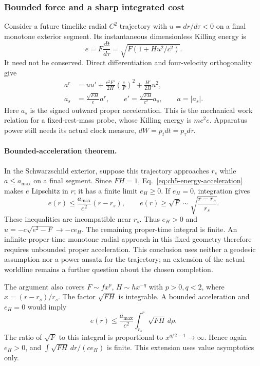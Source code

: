 \documentclass[10pt,twocolumn,letterpaper]{article}
\begin{document}
\subsubsection{Bounded force and a sharp integrated cost}
Consider a future timelike radial $C^2$ trajectory with
$u=dr/d\tau<0$ on a final monotone exterior segment. Its instantaneous
dimensionless Killing energy is
\[
 e=F\frac{dt}{d\tau}=\sqrt{F(1+Hu^2/c^2)}.
\]
It need not be conserved. Direct differentiation and four-velocity
orthogonality give
\begin{align}
 a^r&=uu'+\frac{c^2F'}{2H}\left(\frac eF\right)^2
               +\frac{H'}{2H}u^2,\nonumber\\
 a_s&=\frac{\sqrt{FH}}e a^r,\qquad
 e'=\frac{\sqrt{FH}}{c^2}a_s,\qquad a=|a_s|.
 \label{eq:ch5-energy-acceleration}
\end{align}
Here $a_s$ is the signed outward proper acceleration. This is the
mechanical work relation for a fixed-rest-mass probe, whose Killing
energy is $mc^2e$. Apparatus power still needs its actual clock measure,
$dW=p_tdt=p_\tau d\tau$.

\paragraph{Bounded-acceleration theorem.}
In the Schwarzschild exterior, suppose this trajectory approaches
$r_s$ while $a\leq a_{\max}$ on a final segment. Since $FH=1$,
Eq.~\eqref{eq:ch5-energy-acceleration} makes $e$ Lipschitz in $r$;
it has a finite limit $e_H\geq0$. If $e_H=0$, integration gives
\[
 e(r)\leq\frac{a_{\max}}{c^2}(r-r_s),
 \qquad e(r)\geq\sqrt F\sim\sqrt{\frac{r-r_s}{r_s}}.
\]
These inequalities are incompatible near $r_s$. Thus $e_H>0$ and
$u=-c\sqrt{e^2-F}\to-ce_H$. The remaining proper-time integral is
finite. An infinite-proper-time monotone radial approach in this fixed
geometry therefore requires unbounded proper acceleration. This
conclusion uses neither a geodesic assumption nor a power ansatz for
the trajectory; an extension of the actual worldline remains a further
question about the chosen completion.

The argument also covers $F\sim f x^p$, $H\sim h x^{-q}$ with
$p>0,q<2$, where $x=(r-r_s)/r_s$. The factor $\sqrt{FH}$ is
integrable. A bounded acceleration and $e_H=0$ would imply
\[
 e(r)\leq\frac{a_{\max}}{c^2}\int_{r_s}^r\sqrt{FH}\,d\rho.
\]
The ratio of $\sqrt F$ to this integral is proportional to
$x^{q/2-1}\to\infty$. Hence again $e_H>0$, and
$\int\sqrt{FH}\,dr/(ce_H)$ is finite. This extension uses value
asymptotics only.
\end{document}

